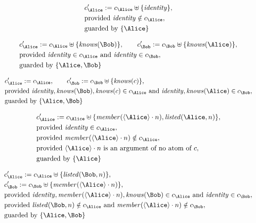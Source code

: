 \begin{align*}
&
c'_
{
\Alice
}
 := 
c_
{
\Alice
}
 \uplus 
\{
\mathit{
identity
}
\}
,\\
&
\text{provided } 
\mathit{
identity
}
 \notin c_
{
\Alice
}
,\\
&
\text{guarded by } \{
\Alice
\}
\end{align*}

\begin{align*}
&
c'_
{
\Alice
}
 := 
c_
{
\Alice
}
 \uplus 
\{
\mathit{
knows
}
(
\Bob
)
\}
, \qquad 
c'_
{
\Bob
}
 := 
c_
{
\Bob
}
 \uplus 
\{
\mathit{
knows
}
(
\Alice
)
\}
,\\
&
\text{provided } 
\mathit{
identity
}
 \in c_
{
\Alice
}
 \text{ and } 
\mathit{
identity
}
 \in c_
{
\Bob
}
,\\
&
\text{guarded by } \{
\Alice
,
\Bob
\}
\end{align*}

\begin{align*}
&
c'_
{
\Alice
}
 := 
c_
{
\Alice
}
, \qquad 
c'_
{
\Bob
}
 := 
c_
{
\Bob
}
 \uplus 
\{
\mathit{
knows
}
(
c
)
\}
,\\
&
\text{provided } 
\mathit{
identity
}
,
\mathit{
knows
}
(
\Bob
)
,
\mathit{
knows
}
(
c
)
 \in c_
{
\Alice
}
 \text{ and } 
\mathit{
identity
}
,
\mathit{
knows
}
(
\Alice
)
 \in c_
{
\Bob
}
,\\
&
\text{guarded by } \{
\Alice
,
\Bob
\}
\end{align*}

\begin{align*}
&
c'_
{
\Alice
}
 := 
c_
{
\Alice
}
 \uplus 
\{
\mathit{
member
}
(
\langle
\Alice
\rangle
\cdot
n
)
,
\mathit{
listed
}
(
\Alice
,
n
)
\}
,\\
&
\text{provided } 
\mathit{
identity
}
 \in c_
{
\Alice
}
,\\
&
\text{provided } 
\mathit{
member
}
(
\langle
\Alice
\rangle
\cdot
n
)
 \notin c_
{
\Alice
}
,\\
&
\text{provided } 
\langle
\Alice
\rangle
\cdot
n
 \text{ is an argument of no atom of } c
,\\
&
\text{guarded by } \{
\Alice
\}
\end{align*}

\begin{align*}
&
c'_
{
\Alice
}
 := 
c_
{
\Alice
}
 \uplus 
\{
\mathit{
listed
}
(
\Bob
,
n
)
\}
,\\
&
c'_
{
\Bob
}
 := 
c_
{
\Bob
}
 \uplus 
\{
\mathit{
member
}
(
\langle
\Alice
\rangle
\cdot
n
)
\}
,\\
&
\text{provided } 
\mathit{
identity
}
,
\mathit{
member
}
(
\langle
\Alice
\rangle
\cdot
n
)
,
\mathit{
knows
}
(
\Bob
)
 \in c_
{
\Alice
}
 \text{ and } 
\mathit{
identity
}
 \in c_
{
\Bob
}
,\\
&
\text{provided } 
\mathit{
listed
}
(
\Bob
,
n
)
 \notin c_
{
\Alice
}
 \text{ and } 
\mathit{
member
}
(
\langle
\Alice
\rangle
\cdot
n
)
 \notin c_
{
\Bob
}
,\\
&
\text{guarded by } \{
\Alice
,
\Bob
\}
\end{align*}
